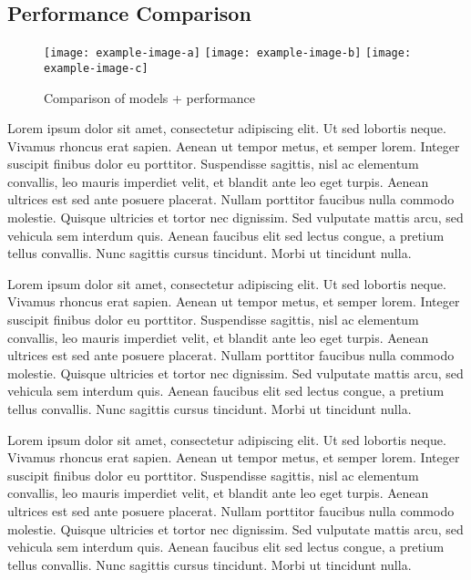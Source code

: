 \subsection{Performance Comparison}
\begin{figure*}
    \centering 
    \texttt{[image: example-image-a]}
    \texttt{[image: example-image-b]}
    \texttt{[image: example-image-c]}

    \caption{Comparison of models + performance}
\end{figure*}

Lorem ipsum dolor sit amet, consectetur adipiscing elit. Ut sed lobortis neque. Vivamus rhoncus erat sapien. Aenean ut tempor metus, et semper lorem. Integer suscipit finibus dolor eu porttitor. Suspendisse sagittis, nisl ac elementum convallis, leo mauris imperdiet velit, et blandit ante leo eget turpis. Aenean ultrices est sed ante posuere placerat. Nullam porttitor faucibus nulla commodo molestie. Quisque ultricies et tortor nec dignissim. Sed vulputate mattis arcu, sed vehicula sem interdum quis. Aenean faucibus elit sed lectus congue, a pretium tellus convallis. Nunc sagittis cursus tincidunt. Morbi ut tincidunt nulla.

Lorem ipsum dolor sit amet, consectetur adipiscing elit. Ut sed lobortis neque. Vivamus rhoncus erat sapien. Aenean ut tempor metus, et semper lorem. Integer suscipit finibus dolor eu porttitor. Suspendisse sagittis, nisl ac elementum convallis, leo mauris imperdiet velit, et blandit ante leo eget turpis. Aenean ultrices est sed ante posuere placerat. Nullam porttitor faucibus nulla commodo molestie. Quisque ultricies et tortor nec dignissim. Sed vulputate mattis arcu, sed vehicula sem interdum quis. Aenean faucibus elit sed lectus congue, a pretium tellus convallis. Nunc sagittis cursus tincidunt. Morbi ut tincidunt nulla.

Lorem ipsum dolor sit amet, consectetur adipiscing elit. Ut sed lobortis neque. Vivamus rhoncus erat sapien. Aenean ut tempor metus, et semper lorem. Integer suscipit finibus dolor eu porttitor. Suspendisse sagittis, nisl ac elementum convallis, leo mauris imperdiet velit, et blandit ante leo eget turpis. Aenean ultrices est sed ante posuere placerat. Nullam porttitor faucibus nulla commodo molestie. Quisque ultricies et tortor nec dignissim. Sed vulputate mattis arcu, sed vehicula sem interdum quis. Aenean faucibus elit sed lectus congue, a pretium tellus convallis. Nunc sagittis cursus tincidunt. Morbi ut tincidunt nulla.

